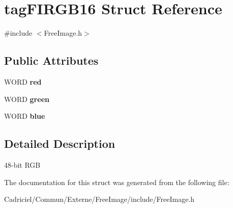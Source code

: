 \hypertarget{structtag_f_i_r_g_b16}{\section{tag\-F\-I\-R\-G\-B16 Struct Reference}
\label{structtag_f_i_r_g_b16}
}


{\ttfamily \#include $<$Free\-Image.\-h$>$}

\subsection*{Public Attributes}
\begin{DoxyCompactItemize}
\item 
\hypertarget{structtag_f_i_r_g_b16_aeaa2393246d6482c02cac30d169ee022}{W\-O\-R\-D {\bfseries red}}\label{structtag_f_i_r_g_b16_aeaa2393246d6482c02cac30d169ee022}

\item 
\hypertarget{structtag_f_i_r_g_b16_a00e213246943f0a47698fdd0d51f9924}{W\-O\-R\-D {\bfseries green}}\label{structtag_f_i_r_g_b16_a00e213246943f0a47698fdd0d51f9924}

\item 
\hypertarget{structtag_f_i_r_g_b16_ae9de217a4d3c01c533bc8e727c0ec0eb}{W\-O\-R\-D {\bfseries blue}}\label{structtag_f_i_r_g_b16_ae9de217a4d3c01c533bc8e727c0ec0eb}

\end{DoxyCompactItemize}


\subsection{Detailed Description}
48-\/bit R\-G\-B 

The documentation for this struct was generated from the following file\-:\begin{DoxyCompactItemize}
\item 
Cadriciel/\-Commun/\-Externe/\-Free\-Image/include/Free\-Image.\-h\end{DoxyCompactItemize}
